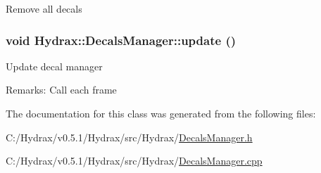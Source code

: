 Remove all decals \hypertarget{class_hydrax_1_1_decals_manager_4006596e38bbdaa941d5d963104a8016}{
\subsubsection[{update}]{\setlength{\rightskip}{0pt plus 5cm}void Hydrax::DecalsManager::update ()}}
\label{class_hydrax_1_1_decals_manager_4006596e38bbdaa941d5d963104a8016}


Update decal manager \begin{Desc}
\item[Remarks:]Call each frame \end{Desc}


The documentation for this class was generated from the following files:\begin{CompactItemize}
\item 
C:/Hydrax/v0.5.1/Hydrax/src/Hydrax/\hyperlink{_decals_manager_8h}{DecalsManager.h}\item 
C:/Hydrax/v0.5.1/Hydrax/src/Hydrax/\hyperlink{_decals_manager_8cpp}{DecalsManager.cpp}\end{CompactItemize}
